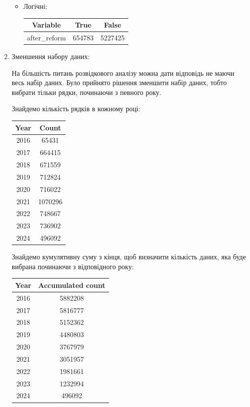 \documentclass[./report.tex]{subfiles}
\begin{document}
\begin{enumerate}
\begin{itemize}
     \item Логічні:

    \begin{tabular}{ccc}
      \hline
      \textbf{Variable} & \textbf{True} & \textbf{False} \\
      \hline
      after\_reform     &  654783       &  5227425       \\
    \end{tabular}

    \end{itemize}

    \pagebreak

    \item Зменшення набору даних:

    На більшість питань розвідкового аналізу можна дати відповідь не маючи весь набір
    даних. Було прийнято рішення зменшити набір даних, тобто вибрати тільки рядки,
    починаючи з певного року.

    Знайдемо кількість рядків в кожному році:

    \begin{tabular}{cc}
      \hline
      \textbf{Year} & \textbf{Count} \\
      \hline
      2016          & 65431          \\
      2017          & 664415         \\
      2018          & 671559         \\
      2019          & 712824         \\
      2020          & 716022         \\
      2021          & 1070296        \\
      2022          & 748667         \\
      2023          & 736902         \\
      2024          & 496092         \\
    \end{tabular}

    Знайдемо кумулятивну суму з кінця, щоб визначити кількість даних, яка буде вибрана
    починаючи з відповідного року:

    \begin{tabular}{cc}
      \hline
      \textbf{Year} & \textbf{Accumulated count} \\
      \hline
      2016 & 5882208 \\
      2017 & 5816777 \\
      2018 & 5152362 \\
      2019 & 4480803 \\
      2020 & 3767979 \\
      2021 & 3051957 \\
      2022 & 1981661 \\
      2023 & 1232994 \\
      2024 & 496092  \\
    \end{tabular}


\end{enumerate}
\end{document}
